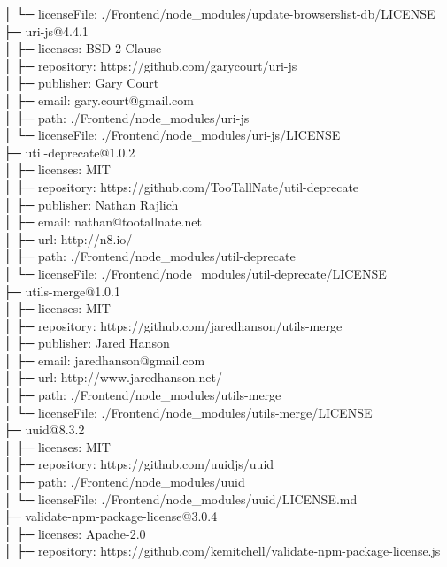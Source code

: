 │  └─ licenseFile: ./Frontend/node\_modules/update-browserslist-db/LICENSE\\
├─ uri-js@4.4.1\\
│  ├─ licenses: BSD-2-Clause\\
│  ├─ repository: https://github.com/garycourt/uri-js\\
│  ├─ publisher: Gary Court\\
│  ├─ email: gary.court@gmail.com\\
│  ├─ path: ./Frontend/node\_modules/uri-js\\
│  └─ licenseFile: ./Frontend/node\_modules/uri-js/LICENSE\\
├─ util-deprecate@1.0.2\\
│  ├─ licenses: MIT\\
│  ├─ repository: https://github.com/TooTallNate/util-deprecate\\
│  ├─ publisher: Nathan Rajlich\\
│  ├─ email: nathan@tootallnate.net\\
│  ├─ url: http://n8.io/\\
│  ├─ path: ./Frontend/node\_modules/util-deprecate\\
│  └─ licenseFile: ./Frontend/node\_modules/util-deprecate/LICENSE\\
├─ utils-merge@1.0.1\\
│  ├─ licenses: MIT\\
│  ├─ repository: https://github.com/jaredhanson/utils-merge\\
│  ├─ publisher: Jared Hanson\\
│  ├─ email: jaredhanson@gmail.com\\
│  ├─ url: http://www.jaredhanson.net/\\
│  ├─ path: ./Frontend/node\_modules/utils-merge\\
│  └─ licenseFile: ./Frontend/node\_modules/utils-merge/LICENSE\\
├─ uuid@8.3.2\\
│  ├─ licenses: MIT\\
│  ├─ repository: https://github.com/uuidjs/uuid\\
│  ├─ path: ./Frontend/node\_modules/uuid\\
│  └─ licenseFile: ./Frontend/node\_modules/uuid/LICENSE.md\\
├─ validate-npm-package-license@3.0.4\\
│  ├─ licenses: Apache-2.0\\
│  ├─ repository: https://github.com/kemitchell/validate-npm-package-license.js\\
